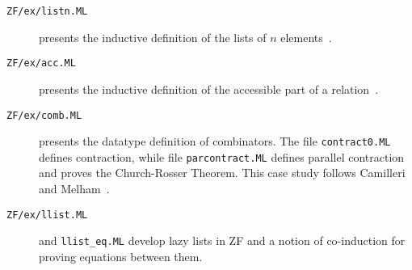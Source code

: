 \begin{description}
\item[{\tt ZF/ex/listn.ML}]
presents the inductive definition of the lists of $n$ elements~\cite{paulin92}.

\item[{\tt ZF/ex/acc.ML}]
presents the inductive definition of the accessible part of a
relation~\cite{paulin92}. 

\item[{\tt ZF/ex/comb.ML}]
  presents the datatype definition of combinators.  The file
  {\tt contract0.ML} defines contraction, while file
  {\tt parcontract.ML} defines parallel contraction and
  proves the Church-Rosser Theorem.  This case study follows Camilleri and
  Melham~\cite{camilleri92}. 

\item[{\tt ZF/ex/llist.ML}]
  and {\tt llist_eq.ML} develop lazy lists in ZF and a notion
  of co-induction for proving equations between them.
\end{description}



